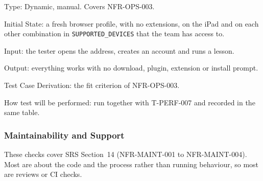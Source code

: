 \documentclass[12pt, titlepage]{article}
\begin{document}
\begin{enumerate}
Type: Dynamic, manual. Covers NFR-OPS-003.

Initial State: a fresh browser profile, with no extensions, on the iPad and
on each other combination in \texttt{SUPPORTED\_DEVICES} that the team has
access to.

Input: the tester opens the address, creates an account and runs a
lesson.

Output: everything works with no download, plugin, extension or install
prompt.

Test Case Derivation: the fit criterion of NFR-OPS-003.

How test will be performed: run together with T-PERF-007 and recorded in
the same table.

\end{enumerate}

\subsubsection{Maintainability and Support}
\label{sec:maint-tests}

These checks cover SRS Section~14 (NFR-MAINT-001 to NFR-MAINT-004). Most
are about the code and the process rather than running behaviour, so most
are reviews or CI checks.
\end{document}

